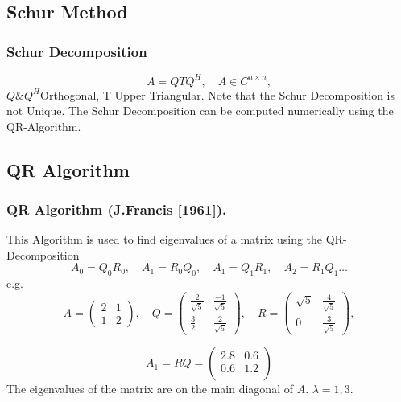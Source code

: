 
\subsection{Schur Method}
\begin{frame}

\frametitle{Schur Decomposition}
\[
A = QTQ^{H}, \quad A \in C^{n \times n} ,
\]
$Q \& Q^{H} $Orthogonal, T Upper Triangular.\newline \newline
Note that the Schur Decomposition is not Unique.\newline \newline
The Schur Decomposition can be computed numerically using the QR-Algorithm.
\end{frame}

\subsection{QR Algorithm}
\begin{frame}
\frametitle{QR Algorithm (J.Francis [1961]).}
This Algorithm is used to find eigenvalues of a matrix using the QR-Decomposition
\[
A_0 =Q_0R_0, \quad A_1 = R_0Q_0, \quad A_1 = Q_1R_1, \quad A_2 = R_1Q_1 \dots
\]
e.g.
\[
   A=  \begin{pmatrix}
        2 & 1 \\
        1 & 2
    \end{pmatrix}, \quad 
    Q = \begin{pmatrix}
        \frac{2}{\sqrt{5}} & \frac{-1}{\sqrt{5}} \\
        \frac{3} {2} & \frac{2}{\sqrt{5}}
    \end{pmatrix}, \quad
    R = \begin{pmatrix}
        \sqrt{5} & \frac{4}{\sqrt{5}} \\
        0 & \frac{3}{\sqrt{5}}
    \end{pmatrix},
\]

\[
A_1 = RQ = 
\begin{pmatrix}
    2.8 & 0.6 \\
    0.6 & 1.2 \\
\end{pmatrix}
\]
The eigenvalues of the matrix are on the main diagonal of $A$.\newline
$\lambda = 1,3.$



\end{frame}

